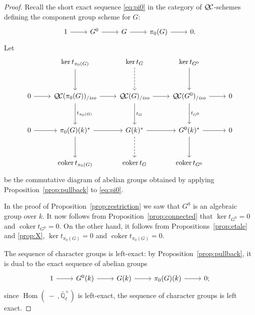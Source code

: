 \documentclass[11pt]{amsart}
\theoremstyle{plain}
\theoremstyle{definition}
\theoremstyle{remark}
\newcommand{\EE}{\mathbb{\bar Q}_\ell}
\newcommand{\Fq}{k}
\newcommand{\EEx}{\EE^\times}
\DeclareMathOperator{\Hom}{Hom}
\DeclareMathOperator{\coker}{coker}
\newcommand{\QC}{{\mathcal{Q\hskip-0.8pt C}}}
\newcommand{\QCiso}[1]{\QC(#1)_{/\textit{iso}}}
\newcommand{\trFrob}[1]{t_{#1}}
\begin{document}
\begin{proof}
  Recall the short exact sequence \eqref{eq:pi0} in the category of $\QC$-schemes
  defining the component group scheme for $G$:
  \[
  \begin{tikzcd}
    1 \rar & G^0 \rar & G \rar & \pi_0(G) \rar & 0.
  \end{tikzcd}
  \]
  Let
  \[
  \begin{tikzcd}[row sep=30]
    {}& \ker \trFrob{\pi_0(G)} \dar & \arrow[dashed]{d} \ker \trFrob{G} & \ker \trFrob{G^0} \dar & \\
    0 \rar & \QCiso{\pi_0(G)} \rar \dar{\trFrob{\pi_0(G)}}
    & \QCiso{G} \rar \dar{\trFrob{G}} & \QCiso{G^0} \rar \dar{\trFrob{G^0}} & 0\\
    0 \rar & \pi_0(G)(\Fq)^* \rar \dar
    & \arrow[dashed]{d} G(\Fq)^* \rar & G^0(\Fq)^* \rar \dar & 0\\
    & \coker \trFrob{\pi_0(G)} & \coker \trFrob{G} &  \coker \trFrob{G^0} &
  \end{tikzcd}
  \]
  be the commutative diagram of abelian groups obtained by applying
  Proposition~\ref{prop:pullback} to \eqref{eq:pi0}. 
  
  In the proof of Proposition~\ref{prop:restriction} we saw that $G^0$ is an algebraic group over $\Fq$. %
  It now follows from Proposition~\ref{prop:connected} 
  that $\ker \trFrob{G^0} =0$ and $\coker \trFrob{G^0}=0$. 
  On the other hand, it follows from Propositions~\ref{prop:etale} and \ref{prop:X}, $\ker \trFrob{\pi_0(G)}=0$
  and $\coker \trFrob{\pi_0(G)}=0$.

  The sequence of character groups is left-exact: by
  Proposition~\ref{prop:pullback}, it is dual to the exact sequence of
  abelian groups
  \begin{equation}\label{eq:pi0k}
  \begin{tikzcd}
    1 \rar & G^0(\Fq) \rar & G(\Fq) \rar & \pi_0(G)(\Fq) \rar & 0;
  \end{tikzcd}
  \end{equation}
  since $\Hom(\ - \ ,\EEx)$ is left-exact, the sequence of
  character groups is left exact.


\end{proof}
\end{document}
